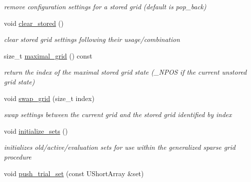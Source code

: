 \begin{DoxyCompactItemize}
\begin{DoxyCompactList}\small\item\em remove configuration settings for a stored grid (default is pop\+\_\+back) \end{DoxyCompactList}\item 
void \hyperlink{classPecos_1_1CombinedSparseGridDriver_ae4337960917eda26a5672e5c6afbb62a}{clear\+\_\+stored} ()\label{classPecos_1_1CombinedSparseGridDriver_ae4337960917eda26a5672e5c6afbb62a}

\begin{DoxyCompactList}\small\item\em clear stored grid settings following their usage/combination \end{DoxyCompactList}\item 
size\+\_\+t \hyperlink{classPecos_1_1CombinedSparseGridDriver_a6edda8aad31eb8a64e180e6a76a6e0e9}{maximal\+\_\+grid} () const \label{classPecos_1_1CombinedSparseGridDriver_a6edda8aad31eb8a64e180e6a76a6e0e9}

\begin{DoxyCompactList}\small\item\em return the index of the maximal stored grid state (\+\_\+\+N\+P\+OS if the current unstored grid state) \end{DoxyCompactList}\item 
void \hyperlink{classPecos_1_1CombinedSparseGridDriver_ae42d43e21fe55d5b6cca7edf86e54818}{swap\+\_\+grid} (size\+\_\+t index)\label{classPecos_1_1CombinedSparseGridDriver_ae42d43e21fe55d5b6cca7edf86e54818}

\begin{DoxyCompactList}\small\item\em swap settings between the current grid and the stored grid identified by index \end{DoxyCompactList}\item 
void \hyperlink{classPecos_1_1CombinedSparseGridDriver_a059e9e1e03a5cd29771d369b76311261}{initialize\+\_\+sets} ()\label{classPecos_1_1CombinedSparseGridDriver_a059e9e1e03a5cd29771d369b76311261}

\begin{DoxyCompactList}\small\item\em initializes old/active/evaluation sets for use within the generalized sparse grid procedure \end{DoxyCompactList}\item 
void \hyperlink{classPecos_1_1CombinedSparseGridDriver_a99c17efb3a8e873b7708652cc1787370}{push\+\_\+trial\+\_\+set} (const U\+Short\+Array \&set)\label{classPecos_1_1CombinedSparseGridDriver_a99c17efb3a8e873b7708652cc1787370}


\end{DoxyCompactItemize}
